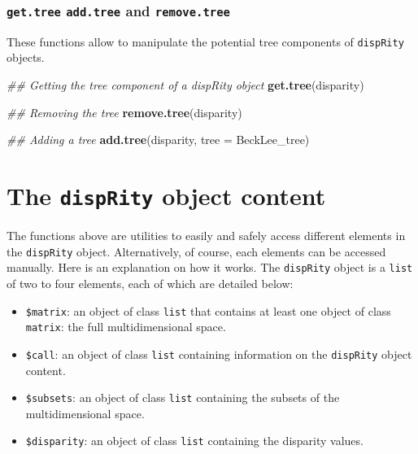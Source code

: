 \documentclass[]{book}
\newenvironment{Shaded}{\begin{snugshade}}{\end{snugshade}}
\newcommand{\CommentTok}[1]{\textcolor[rgb]{0.56,0.35,0.01}{\textit{#1}}}
\newcommand{\DataTypeTok}[1]{\textcolor[rgb]{0.13,0.29,0.53}{#1}}
\newcommand{\KeywordTok}[1]{\textcolor[rgb]{0.13,0.29,0.53}{\textbf{#1}}}
\newcommand{\NormalTok}[1]{#1}
\providecommand{\tightlist}{%
  \setlength{\itemsep}{0pt}\setlength{\parskip}{0pt}}
\begin{document}
\hypertarget{get.tree-add.tree-and-remove.tree}{%
\subsubsection{\texorpdfstring{\texttt{get.tree} \texttt{add.tree} and \texttt{remove.tree}}{get.tree add.tree and remove.tree}}\label{get.tree-add.tree-and-remove.tree}}

These functions allow to manipulate the potential tree components of \texttt{dispRity} objects.

\begin{Shaded}
\begin{Highlighting}[]
\CommentTok{## Getting the tree component of a dispRity object}
\KeywordTok{get.tree}\NormalTok{(disparity)}

\CommentTok{## Removing the tree}
\KeywordTok{remove.tree}\NormalTok{(disparity)}

\CommentTok{## Adding a tree}
\KeywordTok{add.tree}\NormalTok{(disparity, }\DataTypeTok{tree =}\NormalTok{ BeckLee_tree)}
\end{Highlighting}
\end{Shaded}

\hypertarget{disprity-object}{%
\section{\texorpdfstring{The \texttt{dispRity} object content}{The dispRity object content}}\label{disprity-object}}

The functions above are utilities to easily and safely access different elements in the \texttt{dispRity} object.
Alternatively, of course, each elements can be accessed manually.
Here is an explanation on how it works.
The \texttt{dispRity} object is a \texttt{list} of two to four elements, each of which are detailed below:

\begin{itemize}
\tightlist
\item
  \texttt{\$matrix}: an object of class \texttt{list} that contains at least one object of class \texttt{matrix}: the full multidimensional space.
\item
  \texttt{\$call}: an object of class \texttt{list} containing information on the \texttt{dispRity} object content.
\item
  \texttt{\$subsets}: an object of class \texttt{list} containing the subsets of the multidimensional space.
\item
  \texttt{\$disparity}: an object of class \texttt{list} containing the disparity values.
\end{itemize}
\end{document}
